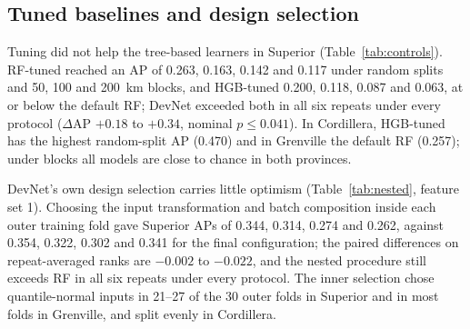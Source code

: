 \documentclass[pdflatex,sn-apa]{sn-jnl}
\begin{document}
\subsection{Tuned baselines and design selection}\label{sec:res-controls}

Tuning did not help the tree-based learners in Superior (Table~\ref{tab:controls}). RF-tuned reached an AP of 0.263, 0.163, 0.142 and 0.117 under random splits and 50, 100 and 200~km blocks, and HGB-tuned 0.200, 0.118, 0.087 and 0.063, at or below the default RF; DevNet exceeded both in all six repeats under every protocol ($\Delta$AP $+0.18$ to $+0.34$, nominal $p \leq 0.041$). In Cordillera, HGB-tuned has the highest random-split AP (0.470) and in Grenville the default RF (0.257); under blocks all models are close to chance in both provinces.

DevNet's own design selection carries little optimism (Table~\ref{tab:nested}, feature set 1). Choosing the input transformation and batch composition inside each outer training fold gave Superior APs of 0.344, 0.314, 0.274 and 0.262, against 0.354, 0.322, 0.302 and 0.341 for the final configuration; the paired differences on repeat-averaged ranks are $-0.002$ to $-0.022$, and the nested procedure still exceeds RF in all six repeats under every protocol. The inner selection chose quantile-normal inputs in 21--27 of the 30 outer folds in Superior and in most folds in Grenville, and split evenly in Cordillera.
\end{document}
